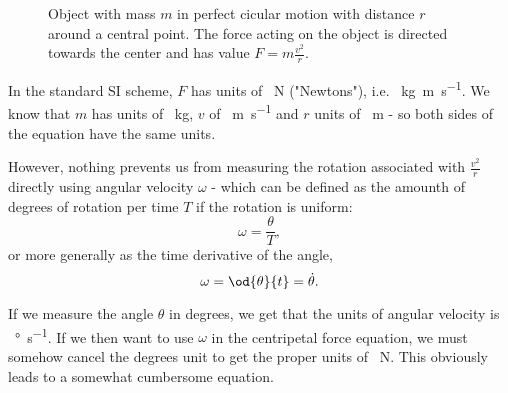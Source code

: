 \begin{figure}
	\begin{center}
	\end{center}
	\caption{Object with mass $m$ in perfect cicular motion with distance $r$ around a central point. The force acting on the object is directed towards the center and has value $F=m\frac{v^{2}}{r}$.}
	\label{fig:centripetal_force}
\end{figure}

In the standard SI scheme, $F$ has units of \SI{}{\newton} ("Newtons"), i.e. \SI{}{\kilo\gram\meter\per\second}. We know that $m$ has units of \SI{}{\kilo\gram}, $v$ of \SI{}{\meter\per\second} and $r$ units of \SI{}{\meter} - so both sides of the equation have the same units.

However, nothing prevents us from measuring the rotation associated with $\frac{v^{2}}{r}$ directly using angular velocity $\omega$ - which can be defined as the amounth of degrees of rotation per time $T$ if the rotation is uniform:
\begin{equation}
	\omega = \frac{\theta}{T},
	\label{eq:angular_velocity_constant}
\end{equation}
or more generally as the time derivative of the angle,
\begin{equation}
	\omega = \od{\theta}{t} = \dot{\theta}.
	\label{eq:angular_velocity_as_derivative}
\end{equation}

If we measure the angle $\theta$ in degrees, we get that the units of angular velocity is \SI{}{\degree\per\second}. If we then want to use $\omega$ in the centripetal force equation, we must somehow cancel the degrees unit to get the proper units of \SI{}{\newton}. This obviously leads to a somewhat cumbersome equation.

